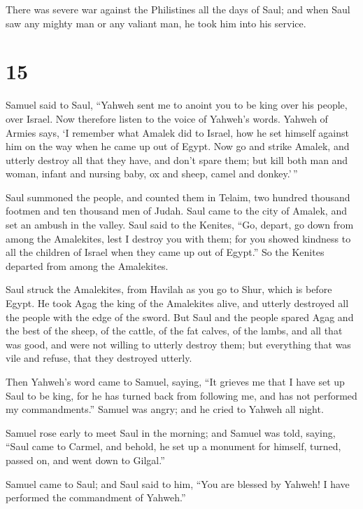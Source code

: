  There was severe war against the Philistines all the days
of Saul; and when Saul saw any mighty man or any valiant man, he took
him into his service.

\hypertarget{section-14}{%
\section{15}\label{section-14}}

 Samuel said to Saul, ``Yahweh sent me to anoint you to be
king over his people, over Israel. Now therefore listen to the voice of
Yahweh's words.  Yahweh of Armies says, `I remember what
Amalek did to Israel, how he set himself against him on the way when he
came up out of Egypt.  Now go and strike Amalek, and utterly
destroy all that they have, and don't spare them; but kill both man and
woman, infant and nursing baby, ox and sheep, camel and donkey.'\,''

 Saul summoned the people, and counted them in Telaim, two
hundred thousand footmen and ten thousand men of Judah. 
Saul came to the city of Amalek, and set an ambush in the valley.
 Saul said to the Kenites, ``Go, depart, go down from among
the Amalekites, lest I destroy you with them; for you showed kindness to
all the children of Israel when they came up out of Egypt.'' So the
Kenites departed from among the Amalekites.

 Saul struck the Amalekites, from Havilah as you go to Shur,
which is before Egypt.  He took Agag the king of the
Amalekites alive, and utterly destroyed all the people with the edge of
the sword.  But Saul and the people spared Agag and the best
of the sheep, of the cattle, of the fat calves, of the lambs, and all
that was good, and were not willing to utterly destroy them; but
everything that was vile and refuse, that they destroyed utterly.

 Then Yahweh's word came to Samuel, saying, 
``It grieves me that I have set up Saul to be king, for he has turned
back from following me, and has not performed my commandments.'' Samuel
was angry; and he cried to Yahweh all night.

 Samuel rose early to meet Saul in the morning; and Samuel
was told, saying, ``Saul came to Carmel, and behold, he set up a
monument for himself, turned, passed on, and went down to Gilgal.''

 Samuel came to Saul; and Saul said to him, ``You are
blessed by Yahweh! I have performed the commandment of Yahweh.''

